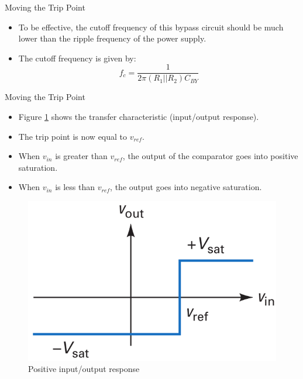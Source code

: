 \documentclass[pdflatex,compress]{beamer}
\begin{document}
\begin{frame}{Moving the Trip Point}
	\begin{itemize}
		\item To be effective, the cutoff frequency of this bypass circuit should be much lower than the ripple frequency of the power supply.
		\item The cutoff frequency is given by:
		\begin{equation}\label{eq:203}
			f_c = \frac{1}{2 \pi (R_1 || R_2) C_{BY}}
		\end{equation}
	\end{itemize}
\end{frame}

\begin{frame}{Moving the Trip Point}
	\begin{multicols}{2}
		\begin{itemize}
			\item Figure \ref{fig:2011b} shows the transfer characteristic (input/output response).
			\item The trip point is now equal to $v_{ref}$.
			\item When $v_{in}$ is greater than $v_{ref}$, the output of the comparator goes into positive saturation.
			\item When $v_{in}$ is less than $v_{ref}$, the output goes into negative saturation.
		\end{itemize}
		\columnbreak
		\begin{figure}
			\centering
			\includegraphics[width=\linewidth]{img/2011b}
			\caption{Positive input/output response}
			\label{fig:2011b}
		\end{figure}
	\end{multicols}
\end{frame}
\end{document}
